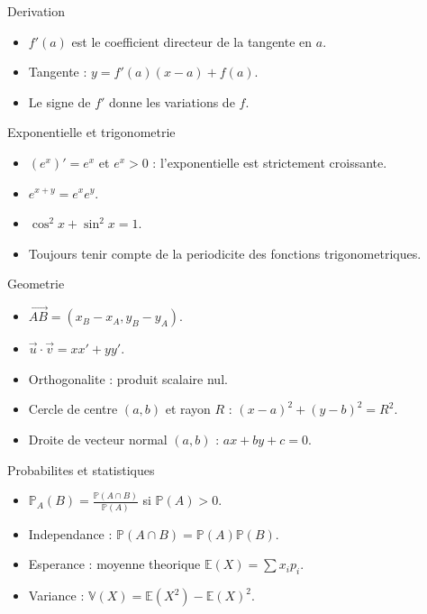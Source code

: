 \documentclass[11pt,a4paper]{article}
\newcommand{\E}{\mathbb{E}}
\newcommand{\V}{\mathbb{V}}
\newcommand{\Pp}{\mathbb{P}}
\newcommand{\vect}[1]{\overrightarrow{#1}}
\begin{document}
\begin{boiteretenir}{Derivation}
\begin{itemize}
  \item $f'(a)$ est le coefficient directeur de la tangente en $a$.
  \item Tangente : $y=f'(a)(x-a)+f(a)$.
  \item Le signe de $f'$ donne les variations de $f$.
\end{itemize}
\end{boiteretenir}

\begin{boiteretenir}{Exponentielle et trigonometrie}
\begin{itemize}
  \item $(e^x)'=e^x$ et $e^x>0$ : l'exponentielle est strictement croissante.
  \item $e^{x+y}=e^xe^y$.
  \item $\cos^2x+\sin^2x=1$.
  \item Toujours tenir compte de la periodicite des fonctions trigonometriques.
\end{itemize}
\end{boiteretenir}

\begin{boiteretenir}{Geometrie}
\begin{itemize}
  \item $\vect{AB}=(x_B-x_A,y_B-y_A)$.
  \item $\vec u\cdot\vec v=xx'+yy'$.
  \item Orthogonalite : produit scalaire nul.
  \item Cercle de centre $(a,b)$ et rayon $R$ : $(x-a)^2+(y-b)^2=R^2$.
  \item Droite de vecteur normal $(a,b)$ : $ax+by+c=0$.
\end{itemize}
\end{boiteretenir}

\begin{boiteretenir}{Probabilites et statistiques}
\begin{itemize}
  \item $\Pp_A(B)=\frac{\Pp(A\cap B)}{\Pp(A)}$ si $\Pp(A)>0$.
  \item Independance : $\Pp(A\cap B)=\Pp(A)\Pp(B)$.
  \item Esperance : moyenne theorique $\E(X)=\sum x_ip_i$.
  \item Variance : $\V(X)=\E(X^2)-\E(X)^2$.
\end{itemize}
\end{boiteretenir}
\end{document}
